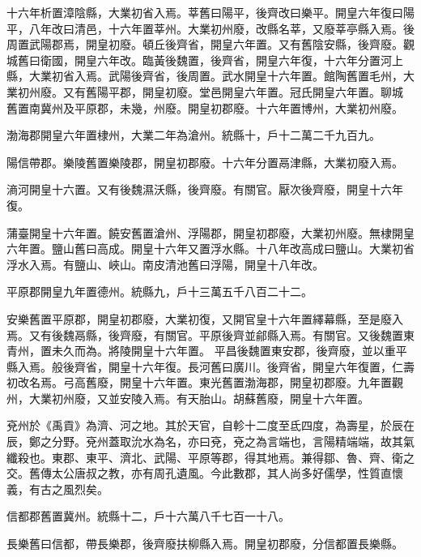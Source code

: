 \begin{pinyinscope}
 十六年析置漳陰縣，大業初省入焉。莘舊曰陽平，後齊改曰樂平。開皇六年復曰陽平，八年改曰清邑，十六年置莘州。大業初州廢，改縣名莘，又廢莘亭縣入焉。後周置武陽郡焉，開皇初廢。頓丘後齊省，開皇六年置。又有舊陰安縣，後齊廢。觀城舊曰衛國，開皇六年改。臨黃後魏置，後齊省，開皇六年復，十六年分置河上縣，大業初省入焉。武陽後齊省，後周置。武水開皇十六年置。館陶舊置毛州，大業初州廢。又有舊陽平郡，開皇初廢。堂邑開皇六年置。冠氏開皇六年置。聊城
 舊置南冀州及平原郡，未幾，州廢。開皇初郡廢。十六年置博州，大業初州廢。



 渤海郡開皇六年置棣州，大業二年為滄州。統縣十，戶十二萬二千九百九。



 陽信帶郡。樂陵舊置樂陵郡，開皇初郡廢。十六年分置鬲津縣，大業初廢入焉。



 滳河開皇十六置。又有後魏濕沃縣，後齊廢。有關官。厭次後齊廢，開皇十六年復。



 蒲臺開皇十六年置。饒安舊置滄州、浮陽郡，開皇初郡廢，大業初州廢。無棣開皇六年置。鹽山舊曰高成。開皇十六年又置浮水縣。十八年改高成曰鹽山。大業初省浮水入焉。有鹽山、峽山。南皮清池舊曰浮陽，開皇十八年改。



 平原郡開皇九年置德州。統縣九，戶十三萬五千八百二十二。



 安樂舊置平原郡，開皇初郡廢，大業初復，又開官皇十六年置繹幕縣，至是廢入焉。又有後魏鬲縣，後齊廢，有關官。平原後齊並鄃縣入焉。有關官。又後魏置東青州，置未久而為。將陵開皇十六年置。
 平昌後魏置東安郡，後齊廢，並以重平縣入焉。般後齊省，開皇十六年復。長河舊曰廣川。後齊省，開皇六年復置，仁壽初改名焉。弓高舊廢，開皇十六年置。東光舊置渤海郡，開皇初郡廢。九年置觀州，大業初州廢，又並安陵入焉。有天胎山。胡蘇舊廢，開皇十六年置。



 兗州於《禹貢》為濟、河之地。其於天官，自軫十二度至氐四度，為壽星，於辰在辰，鄭之分野。兗州蓋取沇水為名，亦曰兗，兗之為言端也，言陽精端端，故其氣纖殺也。東郡、東平、濟北、武陽、平原等郡，得其地焉。兼得鄒、魯、齊、衛之交。舊傳太公唐叔之教，亦有周孔遺風。今此數郡，其人尚多好儒學，性質直懷義，有古之風烈矣。



 信都郡舊置冀州。統縣十二，戶十六萬八千七百一十八。



 長樂舊曰信都，帶長樂郡，後齊廢扶柳縣入焉。開皇初郡廢，分信都置長樂縣。




\end{pinyinscope}
